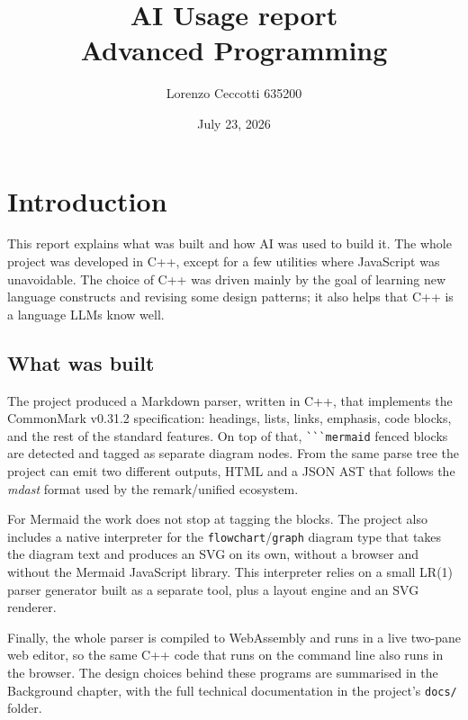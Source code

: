\documentclass[12pt]{report}
\title{AI Usage report \\ \textbf{Advanced Programming}}
\author{Lorenzo Ceccotti 635200}
\date{July 23, 2026}
\begin{document}
\maketitle
\tableofcontents


\chapter{Introduction}

This report explains what was built and how AI was used to build it. The whole project was developed in C++, except for a few utilities where JavaScript was unavoidable. The choice of C++ was driven mainly by the goal of learning new language constructs and revising some design patterns; it also helps that C++ is a language LLMs know well.

\section{What was built}

The project produced a Markdown parser, written in C++, that implements the CommonMark v0.31.2 specification: headings, lists, links, emphasis, code blocks, and the rest of the standard features. On top of that, \verb|```mermaid| fenced blocks are detected and tagged as separate diagram nodes. From the same parse tree the project can emit two different outputs, HTML and a JSON AST that follows the \textit{mdast} format used by the remark/unified ecosystem.

For Mermaid the work does not stop at tagging the blocks. The project also includes a native interpreter for the \texttt{flowchart}/\texttt{graph} diagram type that takes the diagram text and produces an SVG on its own, without a browser and without the Mermaid JavaScript library. This interpreter relies on a small LR(1) parser generator built as a separate tool, plus a layout engine and an SVG renderer.

Finally, the whole parser is compiled to WebAssembly and runs in a live two-pane web editor, so the same C++ code that runs on the command line also runs in the browser. The design choices behind these programs are summarised in the Background chapter, with the full technical documentation in the project's \verb|docs/| folder.
\end{document}
